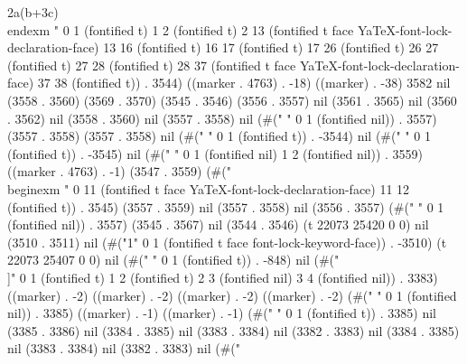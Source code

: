  2a(b+3c)
 \\end{exm}
" 0 1 (fontified t) 1 2 (fontified t) 2 13 (fontified t face YaTeX-font-lock-declaration-face) 13 16 (fontified t) 16 17 (fontified t) 17 26 (fontified t) 26 27 (fontified t) 27 28 (fontified t) 28 37 (fontified t face YaTeX-font-lock-declaration-face) 37 38 (fontified t)) . 3544) ((marker . 4763) . -18) ((marker) . -38) 3582 nil (3558 . 3560) (3569 . 3570) (3545 . 3546) (3556 . 3557) nil (3561 . 3565) nil (3560 . 3562) nil (3558 . 3560) nil (3557 . 3558) nil (#(" " 0 1 (fontified nil)) . 3557) (3557 . 3558) (3557 . 3558) nil (#("
" 0 1 (fontified t)) . -3544) nil (#(" " 0 1 (fontified t)) . -3545) nil (#(" 
" 0 1 (fontified nil) 1 2 (fontified nil)) . 3559) ((marker . 4763) . -1) (3547 . 3559) (#("\\begin{exm}
" 0 11 (fontified t face YaTeX-font-lock-declaration-face) 11 12 (fontified t)) . 3545) (3557 . 3559) nil (3557 . 3558) nil (3556 . 3557) (#(" " 0 1 (fontified nil)) . 3557) (3545 . 3567) nil (3544 . 3546) (t 22073 25420 0 0) nil (3510 . 3511) nil (#("1" 0 1 (fontified t face font-lock-keyword-face)) . -3510) (t 22073 25407 0 0) nil (#("
" 0 1 (fontified t)) . -848) nil (#("%
\\]" 0 1 (fontified t) 1 2 (fontified t) 2 3 (fontified nil) 3 4 (fontified nil)) . 3383) ((marker) . -2) ((marker) . -2) ((marker) . -2) ((marker) . -2) (#("
" 0 1 (fontified nil)) . 3385) ((marker) . -1) ((marker) . -1) (#(" " 0 1 (fontified t)) . 3385) nil (3385 . 3386) nil (3384 . 3385) nil (3383 . 3384) nil (3382 . 3383) nil (3384 . 3385) nil (3383 . 3384) nil (3382 . 3383) nil (#("
